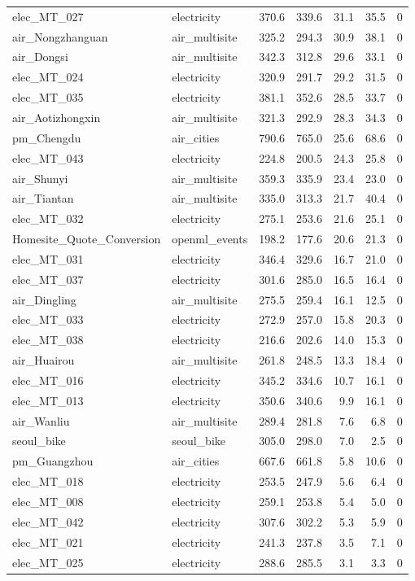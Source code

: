 \begin{table}[t]
\begin{tabular}{llrrrrr}
elec\_MT\_027 & electricity & 370.6 & 339.6 & 31.1 & 35.5 & 0\\
air\_Nongzhanguan & air\_multisite & 325.2 & 294.3 & 30.9 & 38.1 & 0\\
air\_Dongsi & air\_multisite & 342.3 & 312.8 & 29.6 & 33.1 & 0\\
elec\_MT\_024 & electricity & 320.9 & 291.7 & 29.2 & 31.5 & 0\\
elec\_MT\_035 & electricity & 381.1 & 352.6 & 28.5 & 33.7 & 0\\
air\_Aotizhongxin & air\_multisite & 321.3 & 292.9 & 28.3 & 34.3 & 0\\
pm\_Chengdu & air\_cities & 790.6 & 765.0 & 25.6 & 68.6 & 0\\
elec\_MT\_043 & electricity & 224.8 & 200.5 & 24.3 & 25.8 & 0\\
air\_Shunyi & air\_multisite & 359.3 & 335.9 & 23.4 & 23.0 & 0\\
air\_Tiantan & air\_multisite & 335.0 & 313.3 & 21.7 & 40.4 & 0\\
elec\_MT\_032 & electricity & 275.1 & 253.6 & 21.6 & 25.1 & 0\\
Homesite\_Quote\_Conversion & openml\_events & 198.2 & 177.6 & 20.6 & 21.3 & 0\\
elec\_MT\_031 & electricity & 346.4 & 329.6 & 16.7 & 21.0 & 0\\
elec\_MT\_037 & electricity & 301.6 & 285.0 & 16.5 & 16.4 & 0\\
air\_Dingling & air\_multisite & 275.5 & 259.4 & 16.1 & 12.5 & 0\\
elec\_MT\_033 & electricity & 272.9 & 257.0 & 15.8 & 20.3 & 0\\
elec\_MT\_038 & electricity & 216.6 & 202.6 & 14.0 & 15.3 & 0\\
air\_Huairou & air\_multisite & 261.8 & 248.5 & 13.3 & 18.4 & 0\\
elec\_MT\_016 & electricity & 345.2 & 334.6 & 10.7 & 16.1 & 0\\
elec\_MT\_013 & electricity & 350.6 & 340.6 & 9.9 & 16.1 & 0\\
air\_Wanliu & air\_multisite & 289.4 & 281.8 & 7.6 & 6.8 & 0\\
seoul\_bike & seoul\_bike & 305.0 & 298.0 & 7.0 & 2.5 & 0\\
pm\_Guangzhou & air\_cities & 667.6 & 661.8 & 5.8 & 10.6 & 0\\
elec\_MT\_018 & electricity & 253.5 & 247.9 & 5.6 & 6.4 & 0\\
elec\_MT\_008 & electricity & 259.1 & 253.8 & 5.4 & 5.0 & 0\\
elec\_MT\_042 & electricity & 307.6 & 302.2 & 5.3 & 5.9 & 0\\
elec\_MT\_021 & electricity & 241.3 & 237.8 & 3.5 & 7.1 & 0\\
elec\_MT\_025 & electricity & 288.6 & 285.5 & 3.1 & 3.3 & 0\\
\bottomrule
\end{tabular}
\end{table}
